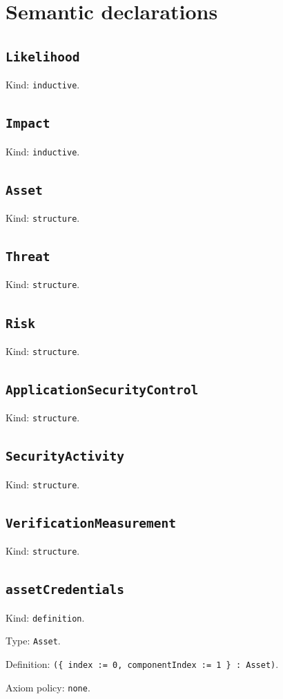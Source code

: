 \documentclass[11pt]{article}
\begin{document}
\section*{Semantic declarations}
\subsection*{\texttt{Likelihood}}
\noindent Kind: \texttt{inductive}.\par
\subsection*{\texttt{Impact}}
\noindent Kind: \texttt{inductive}.\par
\subsection*{\texttt{Asset}}
\noindent Kind: \texttt{structure}.\par
\subsection*{\texttt{Threat}}
\noindent Kind: \texttt{structure}.\par
\subsection*{\texttt{Risk}}
\noindent Kind: \texttt{structure}.\par
\subsection*{\texttt{ApplicationSecurityControl}}
\noindent Kind: \texttt{structure}.\par
\subsection*{\texttt{SecurityActivity}}
\noindent Kind: \texttt{structure}.\par
\subsection*{\texttt{VerificationMeasurement}}
\noindent Kind: \texttt{structure}.\par
\subsection*{\texttt{assetCredentials}}
\noindent Kind: \texttt{definition}.\par
\noindent Type: \texttt{Asset}.\par
\noindent Definition: \texttt{(\{ index := 0, componentIndex := 1 \} : Asset)}.\par
\noindent Axiom policy: \texttt{none}.\par
\end{document}
